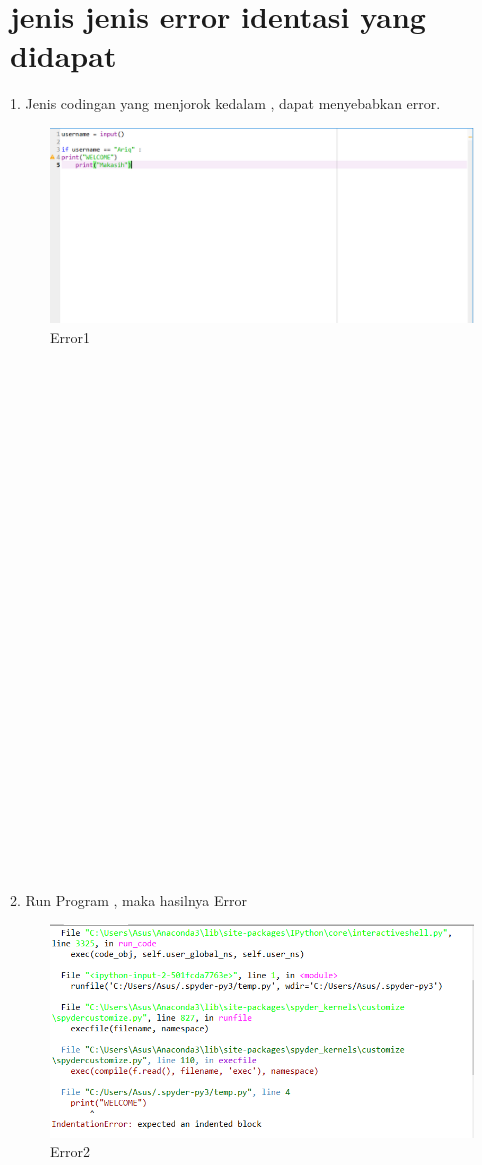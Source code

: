 \documentclass{article}
\begin{document}
\section{jenis jenis error identasi yang didapat}
1. Jenis codingan yang menjorok kedalam , dapat menyebabkan error.\\
\begin{figure}[h]
	\centering
		\includegraphics[scale=0.4]{Gambar/E1}
	\caption{Error1}
\end{figure}
\\
\\
\\
\\
\\
\\
\\
\\
\\
\\
\\
\\
\\
\\
\\
\\
\\
\\
\\
\\
\\
\\
\\
\\
\\
\\
\\
2. Run Program , maka hasilnya 	Error\\
\begin{figure}[h]
	\centering
		\includegraphics[scale=0.5]{Gambar/E2}
	\caption{Error2}
\end{figure}
\end{document}
